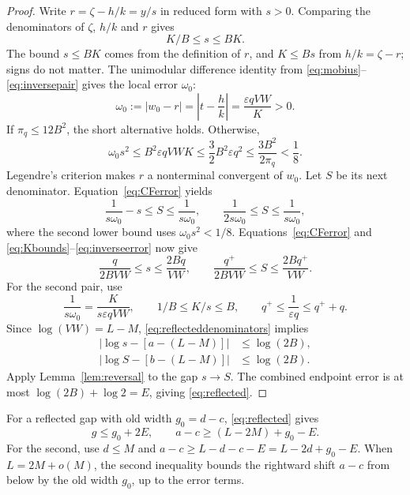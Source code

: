 \documentclass{amsart}
\numberwithin{equation}{section}
\begin{document}
\begin{proof}
Write $r=\zeta-h/k=y/s$ in reduced form with $s>0$.
Comparing the denominators of $\zeta$, $h/k$ and $r$ gives
\begin{equation}\label{eq:sbound}
K/B\le s\le BK.
\end{equation}
The bound $s\le BK$ comes from the definition of $r$, and
$K\le Bs$ from $h/k=\zeta-r$; signs do not matter.
The unimodular difference identity from
\eqref{eq:mobius}--\eqref{eq:inversepair} gives the local error $\omega_0$:
\begin{equation}\label{eq:inverseerror}
\omega_0:=|w_0-r|=\left|t-\frac hk\right|
=\frac{\varepsilon qVW}{K}>0.
\end{equation}
If $\pi_q\le12B^2$, the short alternative holds. Otherwise,
\begin{equation}\label{eq:inverselegendre}
\omega_0s^2\le B^2\varepsilon qVWK
\le\frac32B^2\varepsilon q^2
\le\frac{3B^2}{2\pi_q}<\frac18.
\end{equation}
Legendre's criterion makes $r$ a nonterminal convergent of $w_0$.
Let $S$ be its next denominator. Equation~\eqref{eq:CFerror} yields
\[
\frac1{s\omega_0}-s\le S\le\frac1{s\omega_0},\qquad
\frac1{2s\omega_0}\le S\le\frac1{s\omega_0},
\]
where the second lower bound uses $\omega_0s^2<1/8$.
Equations~\eqref{eq:CFerror} and
\eqref{eq:Kbounds}--\eqref{eq:inverseerror} now give
\begin{equation}\label{eq:reflecteddenominators}
\frac{q}{2BVW}\le s\le\frac{2Bq}{VW},\qquad
\frac{q^+}{2BVW}\le S\le\frac{2Bq^+}{VW}.
\end{equation}
For the second pair, use
\[
\frac1{s\omega_0}=\frac{K}{s\varepsilon qVW},\qquad
1/B\le K/s\le B,\qquad
q^+\le\frac1{\varepsilon q}\le q^++q.
\]
Since $\log(VW)=L-M$, \eqref{eq:reflecteddenominators} implies
\begin{equation}\label{eq:shiftedprofile}
\begin{aligned}
|\log s-[a-(L-M)]|&\le\log(2B),\\
|\log S-[b-(L-M)]|&\le\log(2B).
\end{aligned}
\end{equation}
Apply Lemma~\ref{lem:reversal} to the gap $s\to S$.
The combined endpoint error is at most
$\log(2B)+\log2=E$, giving \eqref{eq:reflected}.
\end{proof}

For a reflected gap with old width $g_0=d-c$,
\eqref{eq:reflected} gives
\begin{equation}\label{eq:widthandgain}
g\le g_0+2E,\qquad a-c\ge(L-2M)+g_0-E.
\end{equation}
For the second, use $d\le M$ and
$a-c\ge L-d-c-E=L-2d+g_0-E$.
When $L=2M+o(M)$, the second inequality bounds the rightward shift
$a-c$ from below by the old width $g_0$, up to the error terms.
\end{document}
